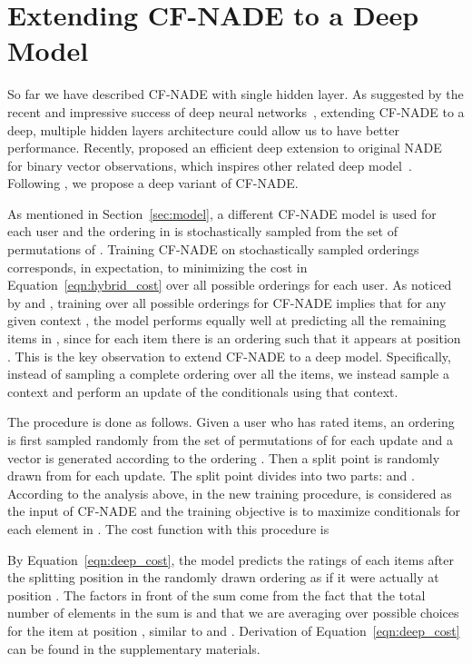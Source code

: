 \documentclass{article}
\newcommand{\cfnade}{CF-NADE\xspace}
\begin{document}
 





\section{Extending \cfnade to a Deep Model}
\label{sec:deepcfnade}
So far we have described \cfnade with single hidden layer. As suggested
by the recent and impressive success of deep neural
networks~\citep{krizhevsky2012imagenet,szegedy2014going,he2015deep},
extending \cfnade to a deep, multiple hidden layers architecture could
allow us to have better performance. Recently, \citet{Uria2013b}
proposed an efficient deep extension to original
NADE~\citep{larochelle2011neural} for binary vector observations,
which inspires other related deep model~\citep{zheng15deep}. Following
\citep{Uria2013b}, we propose a deep variant of \cfnade.


As mentioned in Section~\ref{sec:model}, a different \cfnade model is
used for each user and the ordering  in  is stochastically
sampled from the set of permutations of . Training
\cfnade on stochastically sampled orderings corresponds, in
expectation, to minimizing the cost in Equation~\ref{eqn:hybrid_cost}
over all possible orderings for each user. As noticed by
\citet{Uria2013b} and \citet{zheng15deep}, training over all possible
orderings for \cfnade implies that for any given context
, the model performs equally well at
predicting all the remaining items in ,
since for each item there is an ordering such that it appears at
position . This is the key
observation to extend \cfnade to a deep model. Specifically, instead
of sampling a complete ordering over all the  items, we instead
sample a context  and perform an update of
the conditionals using that context.

The procedure is done as follows. Given a user who has rated 
items, an ordering  is first sampled randomly from the set of
permutations of  for each update and a vector
 is
generated according to the ordering . Then a split point  is
randomly drawn from  for each update. The split point
 divides  into two parts:  and
. According to the analysis above, in the
new training procedure,  is considered as the
input of \cfnade and the training objective is to maximize
conditionals  for each element in
. The cost function with this procedure is

By Equation~\ref{eqn:deep_cost}, the model predicts the ratings of
each items after the splitting position  in the randomly drawn
ordering  as if it were actually at position . The factors in
front of the sum come from the fact that the total number of elements
in the sum is  and that we are averaging over  possible
choices for the item at position , similar to \citep{Uria2013b} and
\citep{zheng15deep}. Derivation of Equation~\ref{eqn:deep_cost} can be
found in the supplementary materials.
\end{document}
